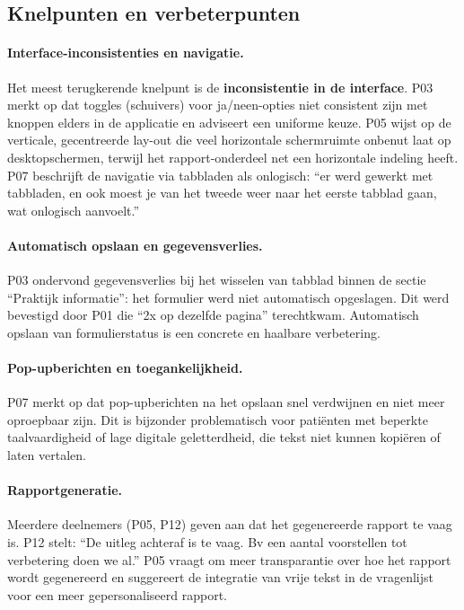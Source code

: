 \subsection{Knelpunten en verbeterpunten}
\label{sec:knelpunten}
 
\paragraph{Interface-inconsistenties en navigatie.}
Het meest terugkerende knelpunt is de \textbf{inconsistentie in de interface}.
P03 merkt op dat toggles (schuivers) voor ja/neen-opties niet consistent zijn met knoppen elders in de applicatie en adviseert een uniforme keuze.
P05 wijst op de verticale, gecentreerde lay-out die veel horizontale schermruimte onbenut laat op desktopschermen, terwijl het rapport-onderdeel net een horizontale indeling heeft.
P07 beschrijft de navigatie via tabbladen als onlogisch: ``er werd gewerkt met tabbladen, en ook moest je van het tweede weer naar het eerste tabblad gaan, wat onlogisch aanvoelt.''
 
\paragraph{Automatisch opslaan en gegevensverlies.}
P03 ondervond gegevensverlies bij het wisselen van tabblad binnen de sectie ``Praktijk informatie'': het formulier werd niet automatisch opgeslagen.
Dit werd bevestigd door P01 die ``2x op dezelfde pagina'' terechtkwam.
Automatisch opslaan van formulierstatus is een concrete en haalbare verbetering.
 
\paragraph{Pop-upberichten en toegankelijkheid.}
P07 merkt op dat pop-upberichten na het opslaan snel verdwijnen en niet meer oproepbaar zijn.
Dit is bijzonder problematisch voor patiënten met beperkte taalvaardigheid of lage digitale geletterdheid, die tekst niet kunnen kopiëren of laten vertalen.
 
\paragraph{Rapportgeneratie.}
Meerdere deelnemers (P05, P12) geven aan dat het gegenereerde rapport te vaag is.
P12 stelt: ``De uitleg achteraf is te vaag. Bv een aantal voorstellen tot verbetering doen we al.''
P05 vraagt om meer transparantie over hoe het rapport wordt gegenereerd en suggereert de integratie van vrije tekst in de vragenlijst voor een meer gepersonaliseerd rapport.
 
